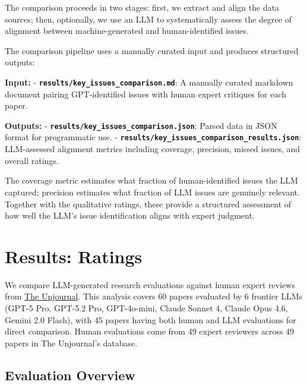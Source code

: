 \documentclass[
  11pt,
  letterpaper,
  DIV=11,
  numbers=noendperiod]{scrreprt}
\begin{document}
The comparison proceeds in two stages: first, we extract and align the
data sources; then, optionally, we use an LLM to systematically assess
the degree of alignment between machine-generated and human-identified
issues.

The comparison pipeline uses a manually curated input and produces
structured outputs:

\textbf{Input:} - \textbf{\texttt{results/key\_issues\_comparison.md}}:
A manually curated markdown document pairing GPT-identified issues with
human expert critiques for each paper.

\textbf{Outputs:} -
\textbf{\texttt{results/key\_issues\_comparison.json}}: Parsed data in
JSON format for programmatic use. -
\textbf{\texttt{results/key\_issues\_comparison\_results.json}}:
LLM-assessed alignment metrics including coverage, precision, missed
issues, and overall ratings.

The coverage metric estimates what fraction of human-identified issues
the LLM captured; precision estimates what fraction of LLM issues are
genuinely relevant. Together with the qualitative ratings, these provide
a structured assessment of how well the LLM's issue identification
aligns with expert judgment.


\chapter{Results: Ratings}\label{results-ratings}

We compare LLM-generated research evaluations against human expert
reviews from \href{https://unjournal.pubpub.org}{The Unjournal}. This
analysis covers 60 papers evaluated by 6 frontier LLMs (GPT-5 Pro,
GPT-5.2 Pro, GPT-4o-mini, Claude Sonnet 4, Claude Opus 4.6, Gemini 2.0
Flash), with 45 papers having both human and LLM evaluations for direct
comparison. Human evaluations come from 49 expert reviewers across 49
papers in The Unjournal's database.

\section{Evaluation Overview}\label{evaluation-overview}
\end{document}
